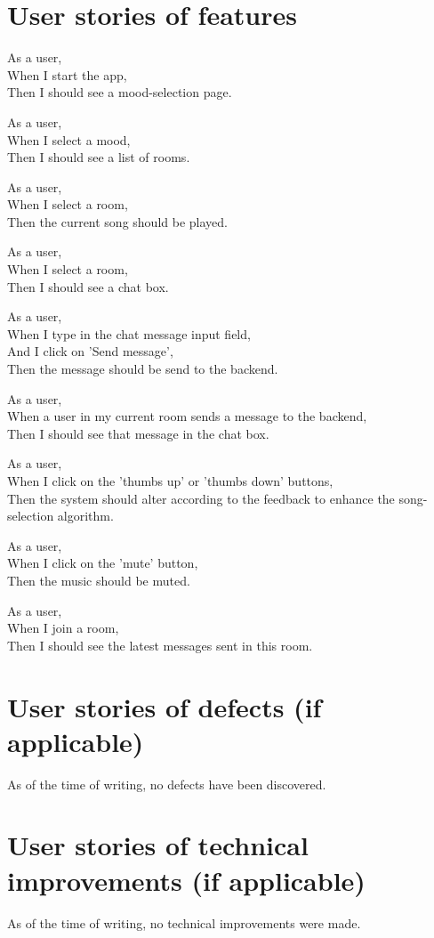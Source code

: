 \section{User stories of features}

As a user,\\
When I start the app,\\
Then I should see a mood-selection page.

As a user,\\
When I select a mood,\\
Then I should see a list of rooms.

As a user,\\
When I select a room,\\
Then the current song should be played.

As a user,\\
When I select a room,\\
Then I should see a chat box.

As a user,\\
When I type in the chat message input field,\\
And I click on 'Send message',\\
Then the message should be send to the backend.

As a user,\\
When a user in my current room sends a message to the backend,\\
Then I should see that message in the chat box.

As a user,\\
When I click on the 'thumbs up' or 'thumbs down' buttons,\\
Then the system should alter according to the feedback to enhance the song-selection algorithm.

As a user,\\
When I click on the 'mute' button,\\
Then the music should be muted.

As a user,\\
When I join a room,\\
Then I should see the latest messages sent in this room.

\section{User stories of defects (if applicable)}
As of the time of writing, no defects have been discovered.

\section{User stories of technical improvements (if applicable)}
As of the time of writing, no technical improvements were made.

